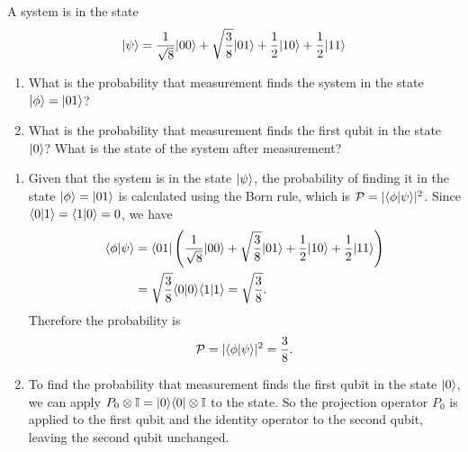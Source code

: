 \begin{exercise}
 A system is in the state
\begin{equation}
 \vert\psi\rangle=\frac{1}{\sqrt{8}}\vert00\rangle+\sqrt{\frac{3}{8}}\vert01\rangle+\frac{1}{2}
\vert10\rangle+\frac{1}{2}\vert11\rangle
\end{equation}
\begin{enumerate}
 \item What is the probability that measurement finds the system in the state
$\vert\phi\rangle=\vert01\rangle$?
\item What is the probability that measurement finds the first qubit in the
state $\vert0\rangle$? What is the state of the system after measurement?
\end{enumerate}
\end{exercise}

\begin{footnotesize}
\begin{solution}
\begin{enumerate}
 \item Given that the system is in the state $\vert\psi\rangle$, the probability of
finding it in the state $\vert\phi\rangle=\vert01\rangle$ is calculated using the Born
rule, which is $\mathcal{P} = |\langle\phi\vert\psi\rangle|^2$. Since $\langle
0\vert1\rangle = \langle 1\vert0\rangle=0$, we have
\begin{equation}
\begin{split}
 \langle\phi\vert\psi\rangle & = \langle01\vert\left(\frac{1}{\sqrt{8}}\vert00\rangle+
\sqrt{\frac{3}{8}}\vert01\rangle+\frac{1}{2}\vert10\rangle+\frac{1}{2}\vert11\rangle\right)\\
 & =\sqrt{\frac{3}{8}}\langle0\vert0\rangle\langle1\vert1\rangle=\sqrt{\frac{3}{8}}.
\end{split}
\end{equation}
Therefore the probability is
\begin{equation}
 \mathcal{P}=|\langle\phi\vert\psi\rangle|^2=\frac{3}{8}.
\end{equation}
\item To find the probability that measurement finds the first qubit in the
state $\vert0\rangle$, we can apply $P_0\otimes\mathbb{I}=\vert0\rangle\langle0\vert\otimes
\mathbb{I}$ to the state. So the projection operator $P_0$ is applied to the
first qubit and the identity operator to the second qubit, leaving the second
qubit unchanged.


\end{enumerate}
\end{solution}
\end{footnotesize}
